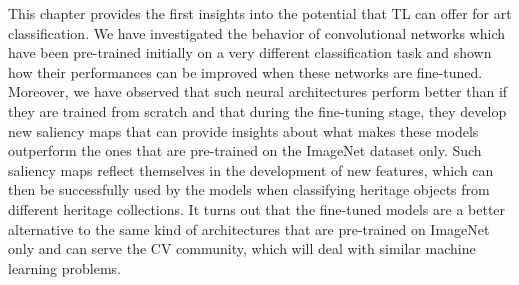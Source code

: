 This chapter provides the first insights into the potential that TL can offer for art classification. We have investigated the behavior of convolutional networks which have been pre-trained initially on a very different classification task and shown how their performances can be improved when these networks are fine-tuned. Moreover, we have observed that such neural architectures perform better than if they are trained from scratch and that during the fine-tuning stage, they develop new saliency maps that can provide insights about what makes these models outperform the ones that are pre-trained on the ImageNet dataset only. Such saliency maps reflect themselves in the development of new features, which can then be successfully used by the models when classifying heritage objects from different heritage collections. It turns out that the fine-tuned models are a better alternative to the same kind of architectures that are pre-trained on ImageNet only and can serve the CV community, which will deal with similar machine learning problems.

